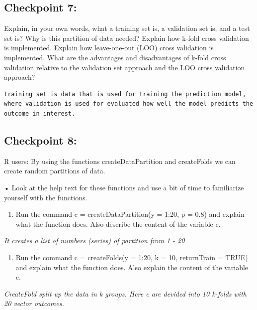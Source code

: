 \documentclass[
  letterpaper,
  DIV=11,
  numbers=noendperiod]{scrartcl}
\providecommand{\tightlist}{%
  \setlength{\itemsep}{0pt}\setlength{\parskip}{0pt}}\usepackage{longtable,booktabs,array}
\begin{document}
\hypertarget{checkpoint-7}{%
\subsection{Checkpoint 7:}\label{checkpoint-7}}

Explain, in your own words, what a training set is, a validation set is,
and a test set is? Why is this partition of data needed? Explain how
k-fold cross validation is implemented. Explain how leave-one-out (LOO)
cross validation is implemented. What are the advantages and
disadvantages of k-fold cross validation relative to the validation set
approach and the LOO cross validation approach?

\begin{verbatim}
Training set is data that is used for training the prediction model, where validation is used for evaluated how well the model predicts the outcome in interest.
\end{verbatim}

\hypertarget{checkpoint-8}{%
\subsection{Checkpoint 8:}\label{checkpoint-8}}

R users: By using the functions createDataPartition and createFolds we
can create random partitions of data.

• Look at the help text for these functions and use a bit of time to
familiarize yourself with the functions.

\begin{enumerate}
\def\labelenumi{(\alph{enumi})}
\tightlist
\item
  Run the command c = createDataPartition(y = 1:20, p = 0.8) and explain
  what the function does. Also describe the content of the variable c.
\end{enumerate}

\emph{It creates a list of numbers (series) of partition from 1 - 20}

\begin{enumerate}
\def\labelenumi{(\alph{enumi})}
\setcounter{enumi}{1}
\tightlist
\item
  Run the command c = createFolds(y = 1:20, k = 10, returnTrain = TRUE)
  and explain what the function does. Also explain the content of the
  variable c.
\end{enumerate}

\emph{CreateFold split up the data in k groups. Here c are devided into
10 k-folds with 20 vector outcomes.}
\end{document}
